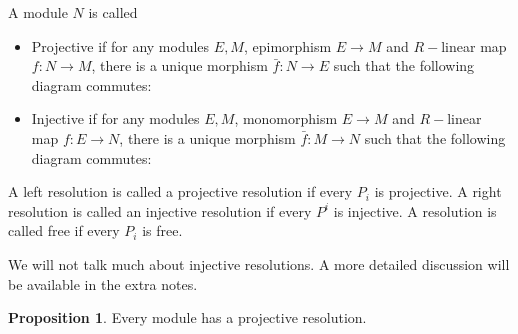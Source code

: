 \documentclass[12pt,reqno]{amsart}
\numberwithin{theorem}{section}
\theoremstyle{definition}
\theoremstyle{remark}
\numberwithin{equation}{section}
\theoremstyle{definition}
\newtheorem{prop}[theorem]{Proposition}
\begin{document}
\begin{definition}
    A module $N$ is called
    \begin{itemize}
        \item Projective if for any modules $E,M$, epimorphism $E \rightarrow M$ and $R-$linear map $f:N \rightarrow M$, there is a unique morphism $\bar f: N \rightarrow E$ such that the following diagram commutes:
            \begin{center}
            \end{center}
        \item Injective if for any modules $E, M$, monomorphism $E \rightarrow M$ and $R-$linear map $f: E \rightarrow N$, there is a unique morphism $\bar f: M \rightarrow N$ such that the following diagram commutes:
            \begin{center}
            \end{center}
    \end{itemize}
\end{definition}
\begin{definition}
    A left resolution is called a projective resolution if every $P_i$ is projective. A right resolution is called an injective resolution if every $P^i$ is injective. A resolution is called free if every $P_i$ is free.
\end{definition}
We will not talk much about injective resolutions. A more detailed discussion will be available in the extra notes.
\begin{prop}
    Every module has a projective resolution.
\end{prop}
\end{document}
